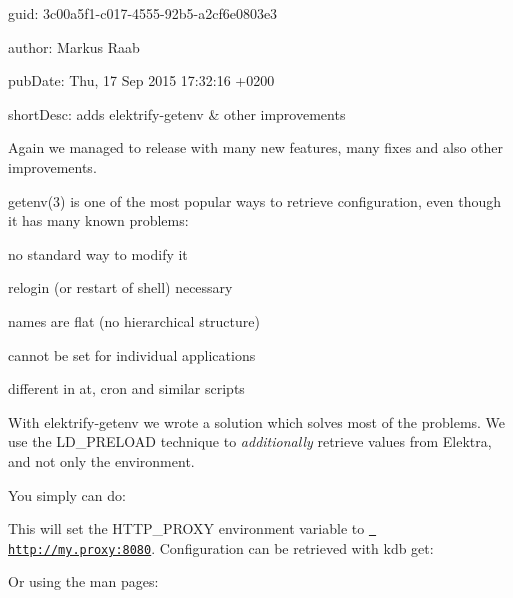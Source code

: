 
\begin{DoxyItemize}
\item guid\+: 3c00a5f1-\/c017-\/4555-\/92b5-\/a2cf6e0803e3
\item author\+: Markus Raab
\item pub\+Date\+: Thu, 17 Sep 2015 17\+:32\+:16 +0200
\item short\+Desc\+: adds elektrify-\/getenv \& other improvements
\end{DoxyItemize}

Again we managed to release with many new features, many fixes and also other improvements.

getenv(3) is one of the most popular ways to retrieve configuration, even though it has many known problems\+:


\begin{DoxyItemize}
\item no standard way to modify it
\item relogin (or restart of shell) necessary
\item names are flat (no hierarchical structure)
\item cannot be set for individual applications
\item different in at, cron and similar scripts
\end{DoxyItemize}

With elektrify-\/getenv we wrote a solution which solves most of the problems. We use the {\ttfamily L\+D\+\_\+\+P\+R\+E\+L\+O\+AD} technique to {\itshape additionally} retrieve values from Elektra, and not only the environment.

You simply can do\+:


\begin{DoxyCode}{0}
\end{DoxyCode}


This will set the {\ttfamily H\+T\+T\+P\+\_\+\+P\+R\+O\+XY} environment variable to {\ttfamily \href{http://my.proxy:8080}{\texttt{ http\+://my.\+proxy\+:8080}}}. Configuration can be retrieved with {\ttfamily kdb get}\+:


\begin{DoxyCode}{0}
\end{DoxyCode}


Or using the man pages\+:


\begin{DoxyCode}{0}
\end{DoxyCode}


